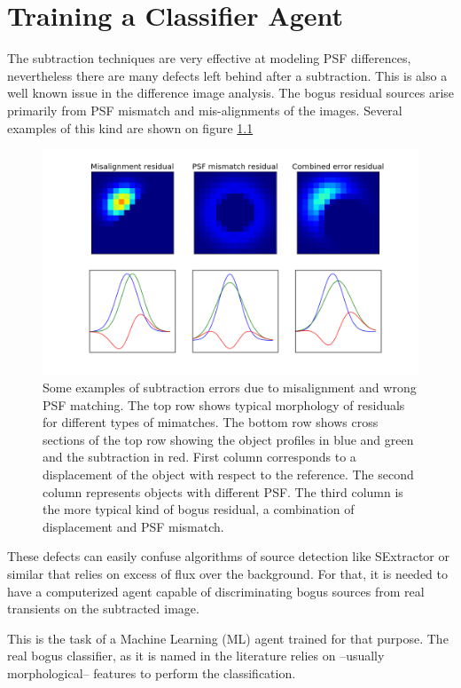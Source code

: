 \chapter{Training a Classifier Agent}

The subtraction techniques are very effective at  modeling PSF differences, nevertheless there are many defects left behind after a subtraction. This is also a well known issue in the difference image analysis. 
The bogus residual sources arise primarily from PSF mismatch and mis-alignments of the images.
Several examples of this kind are shown on figure \ref{fig:subtraction_errors}

\begin{figure}
\centering
\includegraphics[scale=0.5]{figures/subtraction_error}
\caption{Some examples of subtraction errors due to misalignment and wrong PSF matching.
The top row shows typical morphology of residuals for different types of mimatches.
The bottom row shows cross sections of the top row showing the object profiles in blue and green and the subtraction in red.
First column corresponds to a displacement of the object with respect to the reference. 
The second column represents objects with different PSF.
The third column is the more typical kind of bogus residual, a combination of displacement and PSF mismatch.}
\label{fig:subtraction_errors}
\end{figure}

These defects can easily confuse algorithms of source detection like SExtractor or similar that relies on excess of flux over the background. For that, it is needed to have a computerized agent capable of discriminating bogus sources from real transients on the subtracted image. 

This is the task of a Machine Learning (ML) agent trained for that purpose. The real bogus classifier, as it is named in the literature relies on --usually morphological-- features to perform the classification.

